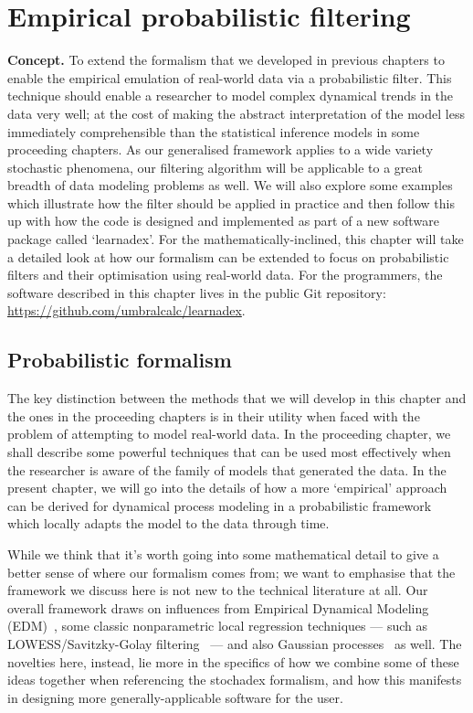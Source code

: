\chapter{\sffamily Empirical probabilistic filtering}

{\bfseries\sffamily Concept.} To extend the formalism that we developed in previous chapters to enable the empirical emulation of real-world data via a probabilistic filter. This technique should enable a researcher to model complex dynamical trends in the data very well; at the cost of making the abstract interpretation of the model less immediately comprehensible than the statistical inference models in some proceeding chapters. As our generalised framework applies to a wide variety stochastic phenomena, our filtering algorithm will be applicable to a great breadth of data modeling problems as well. We will also explore some examples which illustrate how the filter should be applied in practice and then follow this up with how the code is designed and implemented as part of a new software package called `learnadex'. For the mathematically-inclined, this chapter will take a detailed look at how our formalism can be extended to focus on probabilistic filters and their optimisation using real-world data. For the programmers, the software described in this chapter lives in the public Git repository: \href{https://github.com/umbralcalc/learnadex}{https://github.com/umbralcalc/learnadex}.

\section{\sffamily Probabilistic formalism}

The key distinction between the methods that we will develop in this chapter and the ones in the proceeding chapters is in their utility when faced with the problem of attempting to model real-world data. In the proceeding chapter, we shall describe some powerful techniques that can be used most effectively when the researcher is aware of the family of models that generated the data. In the present chapter, we will go into the details of how a more `empirical' approach can be derived for dynamical process modeling in a probabilistic framework which locally adapts the model to the data through time. 

While we think that it's worth going into some mathematical detail to give a better sense of where our formalism comes from; we want to emphasise that the framework we discuss here is not new to the technical literature at all. Our overall framework draws on influences from Empirical Dynamical Modeling (EDM)~\cite{sugihara1990nonlinear}, some classic nonparametric local regression techniques --- such as LOWESS/Savitzky-Golay filtering~\cite{savitzky1964smoothing} --- and also Gaussian processes~\cite{murphy2012machine} as well. The novelties here, instead, lie more in the specifics of how we combine some of these ideas together when referencing the stochadex formalism, and how this manifests in designing more generally-applicable software for the user.

